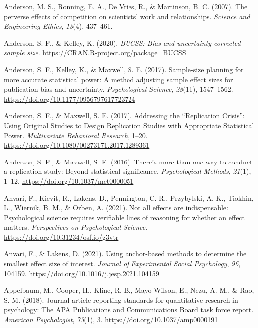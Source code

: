 \documentclass[
  oneside]{krantz}
\newlength{\cslhangindent}
\newlength{\cslentryspacingunit} %
\newenvironment{CSLReferences}[2] %
 {%
  \setlength{\parindent}{0pt}
  \ifodd #1
  \let\oldpar\par
  \def\par{\hangindent=\cslhangindent\oldpar}
  \fi
  \setlength{\parskip}{#2\cslentryspacingunit}
 }%
 {}
\begin{document}
\begin{CSLReferences}{1}{0}
\leavevmode{}%
Anderson, M. S., Ronning, E. A., De Vries, R., \& Martinson, B. C.
(2007). The perverse effects of competition on scientists' work and
relationships. \emph{Science and Engineering Ethics}, \emph{13}(4),
437--461.

\leavevmode{}%
Anderson, S. F., \& Kelley, K. (2020). \emph{BUCSS: Bias and uncertainty
corrected sample size}. \url{https://CRAN.R-project.org/package=BUCSS}

\leavevmode{}%
Anderson, S. F., Kelley, K., \& Maxwell, S. E. (2017). Sample-size
planning for more accurate statistical power: {A} method adjusting
sample effect sizes for publication bias and uncertainty.
\emph{Psychological Science}, \emph{28}(11), 1547--1562.
\url{https://doi.org/10.1177/0956797617723724}

\leavevmode{}%
Anderson, S. F., \& Maxwell, S. E. (2017). Addressing the
{``{Replication Crisis}''}: {Using Original Studies} to {Design
Replication Studies} with {Appropriate Statistical Power}.
\emph{Multivariate Behavioral Research}, 1--20.
\url{https://doi.org/10.1080/00273171.2017.1289361}

\leavevmode{}%
Anderson, S. F., \& Maxwell, S. E. (2016). There's more than one way to
conduct a replication study: {Beyond} statistical significance.
\emph{Psychological Methods}, \emph{21}(1), 1--12.
\url{https://doi.org/10.1037/met0000051}

\leavevmode{}%
Anvari, F., Kievit, R., Lakens, D., Pennington, C. R., Przybylski, A.
K., Tiokhin, L., Wiernik, B. M., \& Orben, A. (2021). Not all effects
are indispensable: {Psychological} science requires verifiable lines of
reasoning for whether an effect matters. \emph{Perspectives on
Psychological Science}. \url{https://doi.org/10.31234/osf.io/g3vtr}

\leavevmode{}%
Anvari, F., \& Lakens, D. (2021). Using anchor-based methods to
determine the smallest effect size of interest. \emph{Journal of
Experimental Social Psychology}, \emph{96}, 104159.
\url{https://doi.org/10.1016/j.jesp.2021.104159}

\leavevmode{}%
Appelbaum, M., Cooper, H., Kline, R. B., Mayo-Wilson, E., Nezu, A. M.,
\& Rao, S. M. (2018). Journal article reporting standards for
quantitative research in psychology: {The APA Publications} and
{Communications Board} task force report. \emph{American Psychologist},
\emph{73}(1), 3. \url{https://doi.org/10.1037/amp0000191}


\end{CSLReferences}
\end{document}
